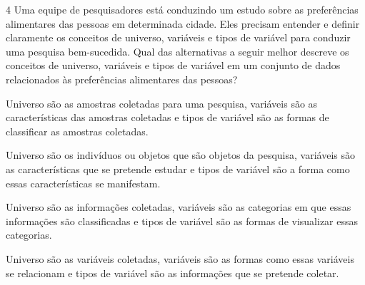 


\num{4} Uma equipe de pesquisadores está conduzindo um estudo sobre as
preferências alimentares das pessoas em determinada cidade. Eles precisam
entender e definir claramente os conceitos de universo, variáveis e tipos
de variável para conduzir uma pesquisa bem-sucedida. Qual das alternativas
a seguir melhor descreve os conceitos de universo, variáveis e tipos de
variável em um conjunto de dados relacionados às preferências alimentares
das pessoas?

\begin{escolha}
\item Universo são as amostras coletadas para uma pesquisa, variáveis são as características das amostras coletadas e tipos de variável são as formas de classificar as amostras coletadas.

\item Universo são os indivíduos ou objetos que são objetos da pesquisa, variáveis são as características que se pretende estudar e tipos de variável são a forma como essas características se manifestam.

\item Universo são as informações coletadas, variáveis são as categorias em que essas informações são classificadas e tipos de variável são as formas de visualizar essas categorias.

\item Universo são as variáveis coletadas, variáveis são as formas como essas variáveis se relacionam e tipos de variável são as informações que se pretende coletar.
\end{escolha}

